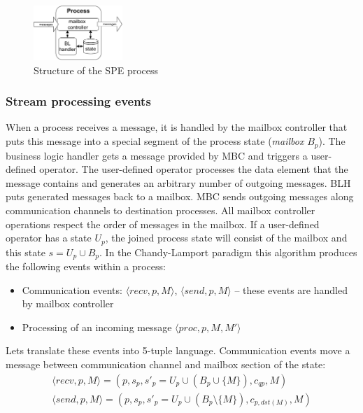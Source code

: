 \begin{figure}[t]
  \centering
  \includegraphics[width=0.3\textwidth]{pics/process-scheme.pdf}
  \caption{Structure of the SPE process}
  \label{fig:spe_process}
\end{figure}

\subsubsection{Stream processing events}

When a process receives a message, it is handled by the mailbox controller that puts this message into a special segment of the process state ({\em mailbox} $B_p$). The business logic handler gets a message provided by MBC and triggers a user-defined operator. The user-defined operator processes the data element that the message contains and generates an arbitrary number of outgoing messages. BLH puts generated messages back to a mailbox. MBC sends outgoing messages along communication channels to destination processes. All mailbox controller operations respect the order of messages in the mailbox. If a user-defined operator has a state $U_p$, the joined process state will consist of the mailbox and this state $s=U_p \cup B_p$. In the Chandy-Lamport paradigm this algorithm produces the following events within a process:
\begin{itemize}
    \item Communication events: $\langle recv, p, M\rangle$, $\langle send, p, M \rangle$ -- these events are handled by mailbox controller
    \item Processing of an incoming message $\langle proc, p, M, M' \rangle$
\end{itemize}

Lets translate these events into 5-tuple language. Communication events move a message between communication channel and mailbox section of the state:
\begin{eqnarray}
\langle recv, p, M\rangle = (p, s_p, s'_p = U_p \cup \left(B_p \cup \{M\}\right), c_{qp}, M) \\
\langle send, p, M \rangle = (p, s_p, s'_p = U_p \cup \left(B_p\setminus\{M\}\right), c_{p, dst(M)}, M)
\end{eqnarray}

